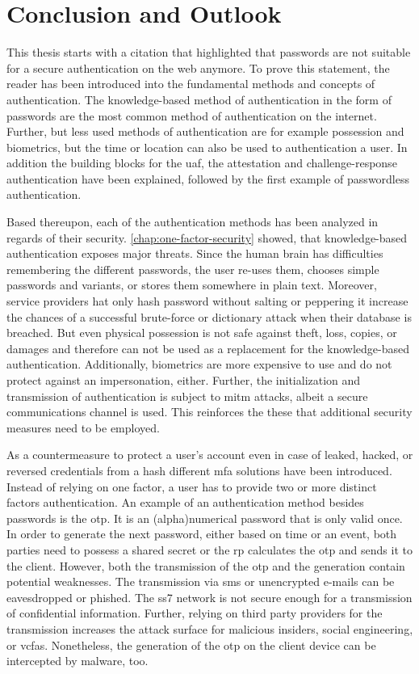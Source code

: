 \chapter{Conclusion and Outlook}

This thesis starts with a citation that highlighted that passwords are not suitable for a secure authentication on the web anymore. To prove this statement, the reader has been introduced into the fundamental methods and concepts of authentication. The knowledge-based method of authentication in the form of passwords are the most common method of authentication on the internet. Further, but less used methods of authentication are for example possession and biometrics, but the time or location can also be used to authentication a user. In addition the building blocks for the \gls{uaf}, the attestation and challenge-response authentication have been explained, followed by the first example of passwordless authentication.

Based thereupon, each of the authentication methods has been analyzed in regards of their security. \autoref{chap:one-factor-security} showed, that knowledge-based authentication exposes major threats. Since the human brain has difficulties remembering the different passwords, the user re-uses them, chooses simple passwords and variants, or stores them somewhere in plain text. Moreover, service providers hat only hash password without salting or peppering it increase the chances of a successful brute-force or dictionary attack when their database is breached. But even physical possession is not safe against theft, loss, copies, or damages and therefore can not be used as a replacement for the knowledge-based authentication. Additionally, biometrics are more expensive to use and do not protect against an impersonation, either. Further, the initialization and transmission of authentication is subject to \gls{mitm} attacks, albeit a secure communications channel is used. This reinforces the these that additional security measures need to be employed.

As a countermeasure to protect a user's account even in case of leaked, hacked, or reversed credentials from a hash different \gls{mfa} solutions have been introduced. Instead of relying on one factor, a user has to provide two or more distinct factors authentication. An example of an authentication method besides passwords is the \gls{otp}. It is an (alpha)numerical password that is only valid once. In order to generate the next password, either based on time or an event, both parties need to possess a shared secret or the \gls{rp} calculates the \gls{otp} and sends it to the client. However, both the transmission of the \gls{otp} and the generation contain potential weaknesses. The transmission via \gls{sms} or unencrypted e-mails can be eavesdropped or phished. The \gls{ss7} network is not secure enough for a transmission of confidential information. Further, relying on third party providers for the transmission increases the attack surface for malicious insiders, social engineering, or \glspl{vcfa}. Nonetheless, the generation of the \gls{otp} on the client device can be intercepted by malware, too.

